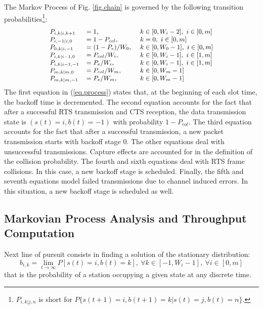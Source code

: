 \documentclass[10pt,onecolumn,a4paper]{IEEEtran}
\begin{document}
The Markov Process of Fig. \ref{fig.chain} is governed by the
following transition probabilities\footnote{$P_{i,k|j,n}$ is short
for $P\{s(t+1)=i,b(t+1)=k|s(t)=j,b(t)=n\}$.}:
\begin{equation}\label{eq.process}\small
\begin{array}{lll}
P_{i,k|i,k+1} &= 1,                     &~ k \in [0,W_i-2], ~ i \in [0,m] \\
P_{i,-1|i,0}  &= 1-P_{col},   &~ k=0,~ i \in [0,m] \\
P_{0,k|i,-1}  &= (1-P_{e})/W_0,         &~ k \in [0,W_0-1], ~ i \in [0,m] \\
P_{i,k|i-1,0}   &= P_{col}/W_i,&~ k \in [0,W_i-1], ~ i \in [1,m] \\
P_{i,k|i-1,-1}&= P_{e}/W_i,&~ k \in [0,W_i-1], ~ i \in [1,m] \\
P_{m,k|m,0}   &= P_{col}/W_m,&~ k \in [0,W_m-1]  \\
P_{m,k|m,-1}   &= P_{e}/W_m,&~ k \in [0,W_m-1]
\end{array}
\end{equation}
The first equation in (\ref{eq.process}) states that, at the
beginning of each slot time, the backoff time is decremented. The
second equation accounts for the fact that after a successful RTS
transmission and CTS reception, the data transmission state is
$(s(t)=i,b(t)=-1)$ with probability $1-P_{col}$. The third
equation accounts for the fact that after a successful
transmission, a new packet transmission starts with backoff stage
0. The other equations deal with unsuccessful transmissions.
Capture effects are accounted for in the definition of the
collision probability. The fourth and sixth equations deal with
RTS frame collisions. In this case, a new backoff stage is
scheduled. Finally, the fifth and seventh equations model failed
transmissions due to channel induced errors. In this situation, a
new backoff stage is scheduled as well.
\subsection{Markovian Process Analysis and Throughput Computation}
Next line of pursuit consists in finding a solution of
the stationary distribution:
\[
b_{i,k}=\lim_{t\rightarrow \infty}P[s(t)=i,b(t)=k],~\forall
k\in[-1,W_i-1],~\forall i\in[0,m]
\]
that is the probability of a station occupying a given state at
any discrete time.
\end{document}
